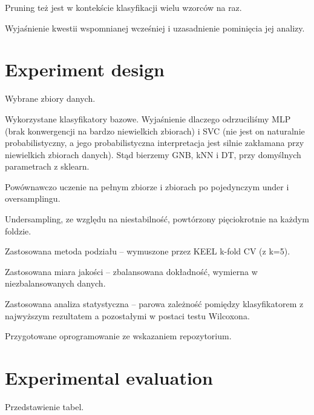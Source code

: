 \documentclass[pmlr]{jmlr}
\begin{document}
Pruning też jest w kontekście klasyfikacji wielu wzorców na raz.

Wyjaśnienie kwestii wspomnianej wcześniej i uzasadnienie pominięcia jej analizy. 

\section{Experiment design}
\label{sec:intro}

Wybrane zbiory danych.

Wykorzystane klasyfikatory bazowe. Wyjaśnienie dlaczego odrzuciliśmy MLP (brak konwergencji na bardzo niewielkich zbiorach) i SVC (nie jest on naturalnie probabilistyczny, a jego probabilistyczna interpretacja jest silnie zakłamana przy niewielkich zbiorach danych). Stąd bierzemy GNB, kNN i DT, przy domyślnych parametrach z sklearn.

Powównawczo uczenie na pełnym zbiorze i zbiorach po pojedynczym under i oversamplingu.

Undersampling, ze względu na niestabilność, powtórzony pięciokrotnie na każdym foldzie.

Zastosowana metoda podziału -- wymuszone przez KEEL k-fold CV (z k=5). 

Zastosowana miara jakości -- zbalansowana dokładność, wymierna w niezbalansowanych danych.

Zastosowana analiza statystyczna -- parowa zależność pomiędzy klasyfikatorem z najwyższym rezultatem a pozostałymi w postaci testu Wilcoxona.

Przygotowane oprogramowanie ze wskazaniem repozytorium.

\section{Experimental evaluation}
\label{sec:intro}

Przedstawienie tabel.

\begin{table}
\end{table}

\begin{table}
\end{table}

\begin{table}
\end{table}
\end{document}
